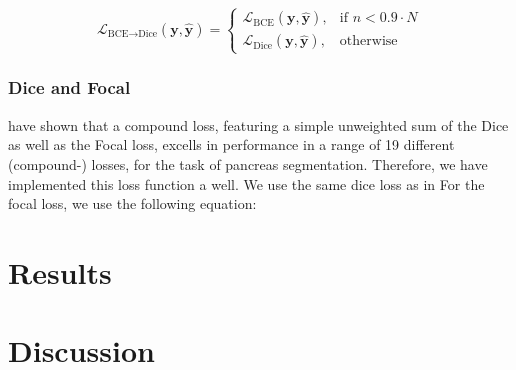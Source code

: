 \documentclass[12pt]{article}
\begin{document}
\begin{equation}
\mathcal{L}_{\text{BCE} \rightarrow \text{Dice}}(\mathbf{y}, \hat{\mathbf{y}}) =
\begin{cases}
\mathcal{L}_{\text{BCE}}(\mathbf{y}, \hat{\mathbf{y}}), & \text{if } n < 0.9 \cdot N \\
\mathcal{L}_{\text{Dice}}(\mathbf{y}, \hat{\mathbf{y}}), & \text{otherwise}
\end{cases}
\end{equation}

\subsubsection{Dice and Focal}
\citeauthor{MA2021102035} have shown that a compound loss, featuring a simple unweighted sum of the Dice as well as the 
Focal loss, excells in performance in a range of 19 different (compound-) losses, for the task of pancreas segmentation.
Therefore, we have implemented this loss function a well. We use the same dice loss as in %
For the focal loss, we use the following equation:


\section{Results}
\section{Discussion}
\printbibliography
\end{document}
